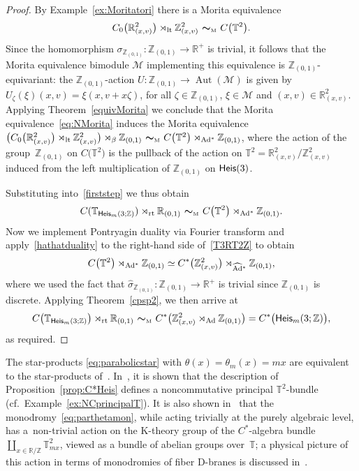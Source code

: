 \documentclass[10pt,a4paper]{amsart}
\numberwithin{equation}{section}
\newcommand{\Z}{\zed}
\newcommand{\mbf}[1]{{\boldsymbol {#1} }}
\newcommand{\Aut}{\operatorname{Aut}}
\newcommand{\Heis}{{\sf Heis}}
\newcommand{\lt}{{\rm lt}}
\newcommand{\rt}{{\rm rt}}
\newcommand{\R}{\real}
\newcommand{\zed}{{\mathbb Z}} %
\newcommand{\real}{{\mathbb R}} %
\newcommand{\torus}{{\mathbb T}} %
\def\Mcal{{\mathcal M}}
\begin{document}
\begin{proof}
By Example~\ref{ex:Moritatori} there is a Morita equivalence
\begin{gather}\label{eq:NMorita}
C_0\big(\real_{(x,v)}^2\big)\rtimes_{\lt} \Z_{(x,v)}^2 \ \mbf\sim_{\text{\tiny M}} \
C\big(\torus^2\big) .
\end{gather}
Since the homomorphism
$\sigma_{\Z_{(0,1)}}\colon \Z_{(0,1)}\to\real^+$ is trivial, it follows
that the Morita equivalence bimodule $\Mcal$ implementing this
equivalence is $\Z_{(0,1)}$-equivariant:
the $\Z_{(0,1)}$-action
$U\colon \Z_{(0,1)}\rightarrow \Aut(\Mcal)$ is given by $U_\zeta(\xi)(x,v)=\xi(x,v+x \zeta)$, for all $\zeta\in
\Z_{(0,1)}$, $\xi\in \Mcal$ and $(x,v)\in \real_{(x,v)}^2 $.
Applying Theorem~\ref{equivMorita} we conclude that the
Morita equivalence~\eqref{eq:NMorita} induces the Morita equivalence
$\big(C_0\big(\real_{(x,v)}^2 \big)\rtimes_{\lt}
\Z_{(x,v)}^2\big) \rtimes_\beta \Z_{(0,1)}\
\mbf\sim_{\text{\tiny M}}\ C\big(\torus^2 \big) \rtimes_{{\rm Ad}^*} \Z_{(0,1)}$, where the action
of the group~$\Z_{(0,1)}$ on $C\big(\torus^2\big)$ is the pullback of the action on
$\torus^2=\real_{(x,v)}^2/\Z_{(x,v)}^2$ induced from the left
multiplication of $\Z_{(0,1)}$ on $\Heis(3)$.

Substituting into~\eqref{firststep} we thus obtain
\begin{gather}\label{T3RT2Z}
C(\torus_{\Heis_m(3;\Z)})\rtimes_\rt\real_{(0,1)} \ \mbf\sim_{\text{\tiny M}} \
C\big(\torus^2 \big) \rtimes_{{\rm Ad}^*} \Z_{(0,1)} .
\end{gather}
Now we implement Pontryagin duality via Fourier transform and apply~\eqref{hathatduality} to the right-hand side of~\eqref{T3RT2Z} to
obtain
\[
C\big(\torus^2\big)\rtimes_{{\rm Ad}^*}\Z_{(0,1)} \simeq
C^*\big(\Z_{(x,v)}^2\big)\rtimes_{\widehat{\rm Ad}{}^*} \Z_{(0,1)} ,
\]
where we used the fact that $\widehat\sigma_{\Z_{(0,1)}}\colon \Z_{(0,1)}\to\real^+$ is
trivial since $\Z_{(0,1)}$ is discrete. Applying
Theorem~\ref{cpsp2}, we then arrive at
\[
C\big(\torus_{\Heis_m(3;\Z)}\big)\rtimes_\rt\real_{(0,1)} \
\mbf\sim_{\text{\tiny M}} \
C^*\big(\Z_{(x,v)}^2\rtimes_{\rm
 Ad}\Z_{(0,1)}\big) = C^*\big(\Heis_m(3;\Z)\big) ,
\]
as required.
\end{proof}

\begin{Remark}
The star-products \eqref{eq:parabolicstar} with
$\theta(x)=\theta_m(x)=m x$ are equivalent to the star-products
of~\cite{Hannabuss2010,Hull2019, Lowe2003}. In~\cite{Echterhoff2009,Hannabuss2010},
it is shown that the description of Proposition~\ref{prop:C*Heis}
defines a noncommutative principal $\torus^2$-bundle
(cf.\ Example~\ref{ex:NCprincipalT}). It is also shown
in~\cite{Echterhoff2009} that the monodromy~\eqref{eq:parthetamon},
while acting trivially at the purely algebraic level, has a~non-trivial action on the K-theory group of the $C^*$-algebra
bundle $\coprod_{x\in\R/\Z} \torus_{m x}^2$, viewed as a bundle of
abelian groups over~$\torus$; a physical picture of this action in
terms of monodromies of fiber D-branes is
discussed in~\cite{Hull2019}.
\end{Remark}
\end{document}
